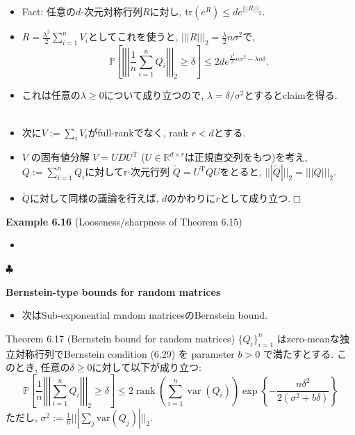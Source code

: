 \documentclass[unicode,aspectratio=169,11pt]{beamer}
\def\qed{\hfill $\Box$}
\def\endexample{\hfill $\clubsuit$}
\newcommand{\var}{\mathrm{var}}
\newcommand{\bb}{\mathbb}
\newcommand{\tr}{\mathrm{T}}
\newcommand{\trace}{\mathrm{tr}}
\begin{document}
\begin{frame}{}{}
  \begin{itemize}
    \item Fact: 任意の$d$-次元対称行列$R$に対し, $\trace(e^R) \le de^{|||R|||_2}$.
    \item $R = \frac{\lambda^2}{2}\sum_{i=1}^n V_i$としてこれを使うと, $||| R|||_2 = \frac{\lambda}{2}n\sigma^2$で, 
          \[
            \mathbb{P}\left[\left|\left|\left|\frac{1}{n} \sum_{i=1}^{n} Q_{i}\right|\right|\right|_{2} \geq \delta\right]
            \leq 2 d e^{\frac{\lambda^{2}}{2} n \sigma^{2}-\lambda n \delta}.
          \]
    \item これは任意の$\lambda \ge 0$について成り立つので, $\lambda = \delta/\sigma^2$とするとclaimを得る.\\　\\
    \item 次に$V := \sum_i V_i$がfull-rankでなく, rank $r < d$とする.
    \item $V$ の固有値分解 $V = UDU^\tr$ ($U \in \bb{R}^{d \times r}$は正規直交列をもつ)を考え,
          $Q := \sum_{i=1}^n Q_i$に対してr-次元行列 $\widetilde{Q} = U^\tr Q U$をとると,
          $||| \widetilde{Q} |||_2 = |||Q|||_2$.
    \item $\widetilde{Q}$に対して同様の議論を行えば, $d$のかわりに$r$として成り立つ.\qed
  \end{itemize}
\end{frame}

\begin{frame}{}{}
  {\bf Example 6.16} (Looseness/sharpness of Theorem 6.15)
  \begin{itemize}
    \item 
  \end{itemize}
  \endexample
\end{frame}

\begin{frame}{}{}
  {\bf Bernstein-type bounds for random matrices}
  \begin{itemize}
    \item 次はSub-exponential random matricesのBernstein bound.
  \end{itemize}
  \begin{block}{Theorem 6.17 (Bernstein bound for random matrices)}
    $\{Q_i\}_{i=1}^n$ はzero-meanな独立対称行列でBernstein condition (6.29) を parameter $b > 0$ で満たすとする.
    このとき, 任意の$\delta \ge 0$に対して以下が成り立つ:
    \[
      \mathbb{P}\left[\frac{1}{n}\left|\left|\left|\sum_{i=1}^{n} Q_{i}\right|\right|\right|_{2} \geq \delta\right]
      \leq 2 \operatorname{rank}\left(\sum_{i=1}^{n} \operatorname{var}\left(Q_{i}\right)\right) \exp \left\{-\frac{n \delta^{2}}{2\left(\sigma^{2}+b \delta\right)}\right\}
      \tag{6.42}
    \]
    ただし, $\sigma^2 := \frac{1}{n}||| \sum_j \var(Q_j)|||_2$.
  \end{block}
\end{frame}
\end{document}
